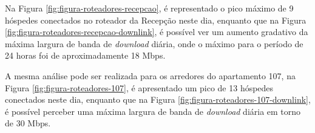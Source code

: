         \begin{figure}[!h]
    	\end{figure}
    	
Na Figura \ref{fig:figura-roteadores-recepcao}, é representado o pico máximo de 9 hóspedes conectados no roteador da Recepção neste dia, enquanto que na Figura \ref{fig:figura-roteadores-recepcao-downlink}, é possível ver um aumento gradativo da máxima largura de banda de \textit{download} diária, onde o máximo para o período de 24 horas foi de aproximadamente 18 Mbps.

        \begin{figure}[!h]
    	\end{figure}
\newpage
A mesma análise pode ser realizada para os arredores do apartamento 107, na Figura \ref{fig:figura-roteadores-107}, é apresentado um pico de 13 hóspedes conectados neste dia, enquanto que na Figura \ref{fig:figura-roteadores-107-downlink}, é possível perceber uma máxima largura de banda de \textit{download} diária em torno de 30 Mbps.

